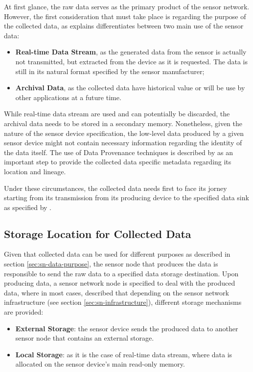 At first glance, the raw data serves as the primary product of the sensor
network. However, the first consideration that must take place is regarding the
purpose of the collected data, as \cite{sn-provenance} explains
differentiates between two main use of the sensor data:

\begin{itemize}
  \item \textbf{Real-time Data Stream}, as the generated data from the sensor is
  actually not transmitted, but extracted from the device as it is requested.
  The data is still in its natural format specified by the sensor manufacturer;
  \item \textbf{Archival Data}, as the collected data have historical value or will
  be use by other applications at a future time. 
\end{itemize}

While real-time data stream are used and can potentially be discarded, the
archival data needs to be stored in a secondary memory. Nonetheless, given the
nature of the sensor device specification, the low-level data produced
by a given sensor device might not contain necessary information regarding the
identity of the data itself. The use of Data Provenance techniques is described
by \cite{sn-provenance} as an important step to provide the collected data 
specific metadata regarding its location and lineage.

Under these circumstances, the collected data needs first to face its jorney
starting from its transmission from its producing device to the specified data 
sink as specified by \cite{sn-storage01} \cite{sn-storage02} \cite{sn-storage03}.

\subsection{Storage Location for Collected Data}
\label{sec:sn-storage-locations}

Given that collected data can be used for different purposes as described in
section \ref{sec:sn-data-purpose}, the sensor node that produces the data is
responsible to send the raw data to a specified data storage destination. Upon
producing data, a sensor network node is specified to deal with the produced
data, where in most cases, \cite{sn-storage03} described that depending on the
sensor network infrastructure (see section \ref{sec:sn-infrastructure}),
different storage mechanisms are provided:

\begin{itemize}
  \item \textbf{External Storage}: the sensor device sends the produced data to
  another sensor node that contains an external storage. 
  \item \textbf{Local Storage}: as it is the case of real-time data stream, where data
  is allocated on the sensor device's main read-only memory.
\end{itemize}

